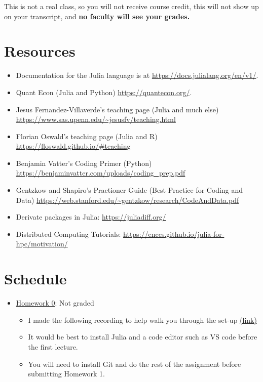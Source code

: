 \documentclass[
]{book}
\providecommand{\tightlist}{%
  \setlength{\itemsep}{0pt}\setlength{\parskip}{0pt}}
\begin{document}
This is not a real class, so you will not receive course credit, this will not show up on your transcript, and \textbf{no faculty will see your grades.}

\hypertarget{resources}{%
\section{Resources}\label{resources}}

\begin{itemize}
\tightlist
\item
  Documentation for the Julia language is at \url{https://docs.julialang.org/en/v1/}.
\item
  Quant Econ (Julia and Python) \url{https://quantecon.org/}.
\item
  Jesus Fernandez-Villaverde's teaching page (Julia and much else) \url{https://www.sas.upenn.edu/~jesusfv/teaching.html}
\item
  Florian Oswald's teaching page (Julia and R) \url{https://floswald.github.io/\#teaching}
\item
  Benjamin Vatter's Coding Primer (Python) \url{https://benjaminvatter.com/uploads/coding_prep.pdf}
\item
  Gentzkow and Shapiro's Practioner Guide (Best Practice for Coding and Data) \url{https://web.stanford.edu/~gentzkow/research/CodeAndData.pdf}
\item
  Derivate packages in Julia: \url{https://juliadiff.org/}
\item
  Distributed Computing Tutorials: \url{https://enccs.github.io/julia-for-hpc/motivation/}
\end{itemize}

\hypertarget{schedule}{%
\section{Schedule}\label{schedule}}

\begin{itemize}
\tightlist
\item
  \href{https://kevinghunt.github.io/ComputationCamp/homeworks/homework0.html}{Homework 0}: Not graded

  \begin{itemize}
  \tightlist
  \item
    I made the following recording to help walk you through the set-up \href{https://uwmadison.zoom.us/rec/share/SbHWe_IMXFEaNy6ujwbKphJ2r3TgOvHtJqpkHT17NZDpX7cXcMdZhQtfmoC-WGNI.iN1B20YE_uH-QuFT?startTime=1690209565000}{(link)}
  \item
    It would be best to install Julia and a code editor such as VS code before the first lecture.
  \item
    You will need to install Git and do the rest of the assignment before submitting Homework 1.
  \end{itemize}
\end{itemize}
\end{document}
